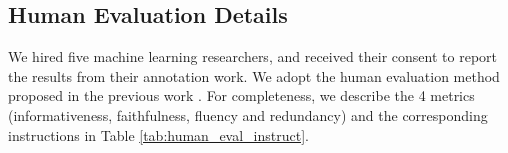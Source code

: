 


\subsection{Human Evaluation Details}
We hired five machine learning researchers, and received their consent to report the results from their annotation work.
We adopt the human evaluation method proposed in the previous work \citep{xie-etal-2024-shot}.
For completeness, we describe the 4 metrics (informativeness, faithfulness, fluency and redundancy) and the corresponding instructions in Table \ref{tab:human_eval_instruct}.


